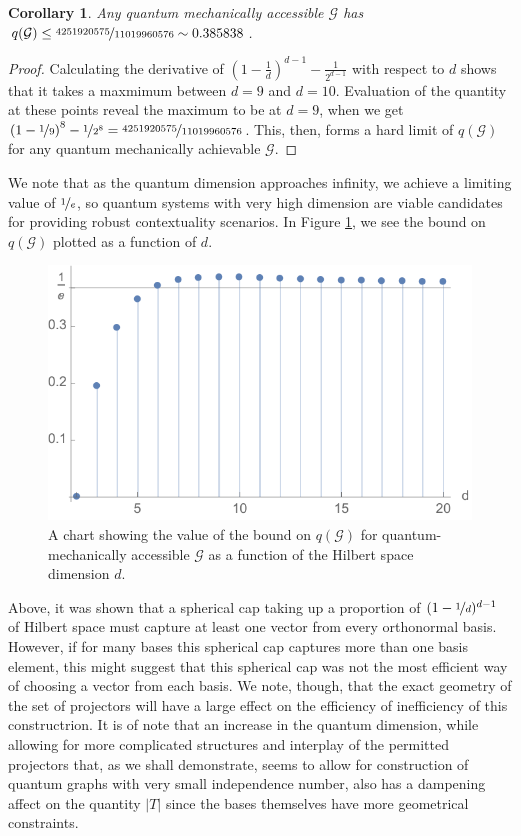 \documentclass{amsart}
\newtheorem{cor}{Corollary}
\theoremstyle{definition}
\begin{document}
\begin{cor}
Any quantum mechanically accessible $\mathcal{G}$ has  $q(\mathcal{G})\leq\nicefrac{4251920575}{11019960576}\sim0.385838$.
\end{cor}
\begin{proof}
Calculating the derivative of $ \left(1-\frac1d\right)^{d-1}-\frac{1}{2^{d-1}}$ with respect to $d$ shows that it takes a maxmimum between $d=9$ and $d=10$. Evaluation of the quantity at these points reveal the maximum to be at $d=9$, when we get $\left(1-\nicefrac19\right)^{8}-\nicefrac{1}{2^{8}}=\nicefrac{4251920575}{11019960576}$. This, then, forms a hard limit of $q(\mathcal{G})$ for any quantum mechanically achievable $\mathcal{G}$.
\end{proof}
We note that as the quantum dimension approaches infinity, we achieve a limiting value of $\nicefrac1e$, so quantum systems with very high dimension are viable candidates for providing robust contextuality scenarios. In Figure \ref{boundgraph}, we see the bound on $q(\mathcal{G})$ plotted as a function of $d$.

\begin{figure}
\begin{center}
\includegraphics{boundgraph}
\caption{A chart showing the value of the bound on $q(\mathcal{G})$ for quantum-mechanically accessible $\mathcal{G}$ as a function of the Hilbert space dimension $d$.}
\label{boundgraph}
\end{center}
\end{figure}
Above, it was shown that a spherical cap taking up a proportion of $(1-\nicefrac1d)^{d-1}$ of Hilbert space must capture at least one vector from every orthonormal basis. However, if for many bases this spherical cap captures more than one basis element, this might suggest that this spherical cap was not the most efficient way of choosing a vector from each basis. We note, though, that the exact geometry of the set of projectors will have a large effect on the efficiency of inefficiency of this constructrion. It is of note that an increase in the quantum dimension, while allowing for more complicated structures and interplay of the permitted projectors that, as we shall demonstrate, seems to allow for construction of quantum graphs with very small independence number, also has a dampening affect on the quantity $|T|$ since the bases themselves have more geometrical constraints. %
\end{document}
